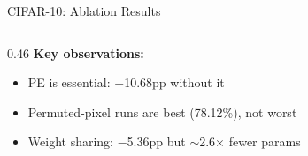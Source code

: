 \documentclass[aspectratio=169,11pt]{beamer}
\begin{document}
\begin{frame}[shrink=5]{CIFAR-10: Ablation Results}
\begin{columns}[T]
\begin{column}{0.46\textwidth}
      \vspace{0.3em}
      \textbf{Key observations:}
      \begin{itemize}
        \item PE is \alert{essential}: $-$10.68pp without it
        \item Permuted-pixel runs are \alert{best} (78.12\%), not worst
        \item Weight sharing: $-$5.36pp but $\sim$2.6$\times$ fewer params
      \end{itemize}
    \end{column}
  \end{columns}
\end{frame}

\end{document}
